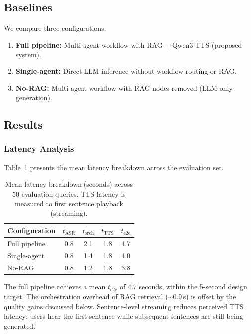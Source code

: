 \documentclass[10pt, a4paper, twocolumn]{article}
\begin{document}
\subsection{Baselines}

We compare three configurations:
\begin{enumerate}[label=(\alph*), nosep]
    \item \textbf{Full pipeline:} Multi-agent workflow with RAG + Qwen3-TTS (proposed system).
    \item \textbf{Single-agent:} Direct LLM inference without workflow routing or RAG.
    \item \textbf{No-RAG:} Multi-agent workflow with RAG nodes removed (LLM-only generation).
\end{enumerate}

\subsection{Results}

\subsubsection{Latency Analysis}

Table~\ref{tab:latency} presents the mean latency breakdown across the evaluation set.

\begin{table}[t]
    \centering
    \caption{Mean latency breakdown (seconds) across 50 evaluation queries. TTS latency is measured to first sentence playback (streaming).}
    \label{tab:latency}
    \small
    \begin{tabular}{@{}lcccc@{}}
        \toprule
        \textbf{Configuration} & $t_\text{ASR}$ & $t_\text{orch}$ & $t_\text{TTS}$ & $t_\text{e2e}$ \\
        \midrule
        Full pipeline & 0.8 & 2.1 & 1.8 & 4.7 \\
        Single-agent & 0.8 & 1.4 & 1.8 & 4.0 \\
        No-RAG & 0.8 & 1.2 & 1.8 & 3.8 \\
        \bottomrule
    \end{tabular}
\end{table}

\noindent The full pipeline achieves a mean $t_\text{e2e}$ of 4.7 seconds, within the 5-second design target.
The orchestration overhead of RAG retrieval (${\sim}$0.9\,s) is offset by the quality gains discussed below.
Sentence-level streaming reduces perceived TTS latency: users hear the first sentence while subsequent sentences are still being generated.
\end{document}
